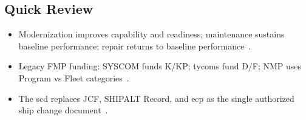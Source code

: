 \documentclass[../main.tex]{subfiles}
\begin{document}
\subsection{Quick Review}
\begin{itemize}
  \item Modernization improves capability and readiness; maintenance sustains baseline performance; repair returns to baseline performance~\autocite{edo-4-1-2-navy-modernization-2025}.
  \item Legacy FMP funding: SYSCOM funds K/KP; \acp{tycom} fund D/F; NMP uses Program vs Fleet categories~\autocite{edo-4-1-2-navy-modernization-2025}.
  \item The \ac{scd} replaces JCF, SHIPALT Record, and \ac{ecp} as the single authorized ship change document~\autocite{edo-4-1-2-navy-modernization-2025,SL720-AA-MAN-030,JFMM-VolVI-RevD-Chg5-2025}.
\end{itemize}

\end{document}
